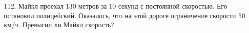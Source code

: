 112. Майкл проехал 130 метров за 10 секунд с постоянной скоростью. Его остановил полицейский. Оказалось, что на этой дороге ограничение скорости 50 км/ч. Превысил ли Майкл скорость?\\
